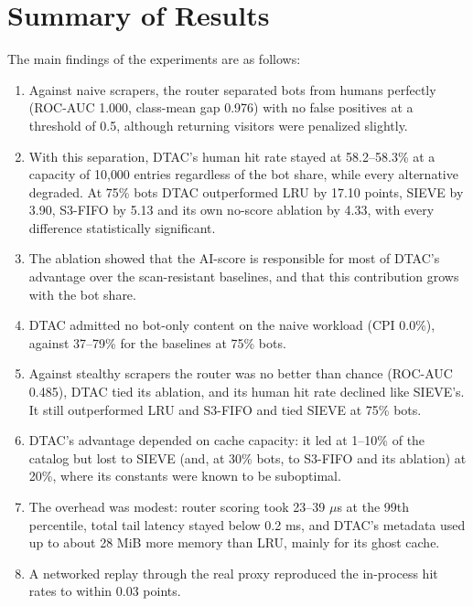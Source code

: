 \section{Summary of Results}
The main findings of the experiments are as follows:
\begin{enumerate}
    \item Against naive scrapers, the router separated bots from humans perfectly (ROC-AUC 1.000, class-mean gap 0.976) with no false positives at a threshold of 0.5, although returning visitors were penalized slightly.
    \item With this separation, DTAC's human hit rate stayed at 58.2--58.3\% at a capacity of 10{,}000 entries regardless of the bot share, while every alternative degraded. At 75\% bots DTAC outperformed LRU by 17.10 points, SIEVE by 3.90, S3-FIFO by 5.13 and its own no-score ablation by 4.33, with every difference statistically significant.
    \item The ablation showed that the AI-score is responsible for most of DTAC's advantage over the scan-resistant baselines, and that this contribution grows with the bot share.
    \item DTAC admitted no bot-only content on the naive workload (CPI 0.0\%), against 37--79\% for the baselines at 75\% bots.
    \item Against stealthy scrapers the router was no better than chance (ROC-AUC 0.485), DTAC tied its ablation, and its human hit rate declined like SIEVE's. It still outperformed LRU and S3-FIFO and tied SIEVE at 75\% bots.
    \item DTAC's advantage depended on cache capacity: it led at 1--10\% of the catalog but lost to SIEVE (and, at 30\% bots, to S3-FIFO and its ablation) at 20\%, where its constants were known to be suboptimal.
    \item The overhead was modest: router scoring took 23--39 $\mu$s at the 99th percentile, total tail latency stayed below 0.2 ms, and DTAC's metadata used up to about 28 MiB more memory than LRU, mainly for its ghost cache.
    \item A networked replay through the real proxy reproduced the in-process hit rates to within 0.03 points.
\end{enumerate}
